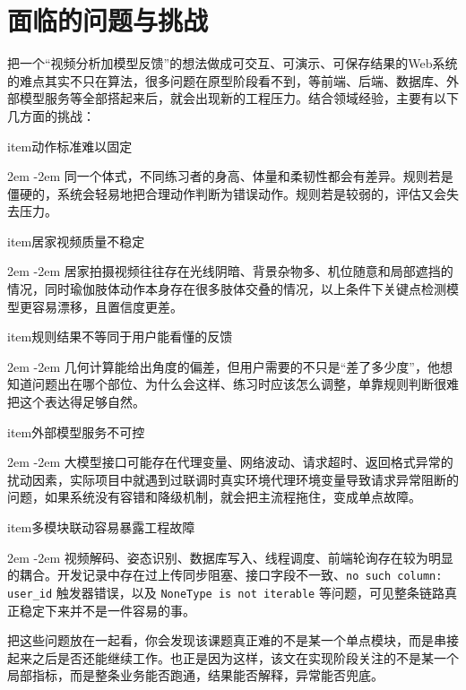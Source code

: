 \documentclass[UTF8,twoside]{ctexrep}
\makeatletter
\def@NAT@last@yr{\@citea}%
\def@NAT@last@yr{-\NAT@penalty}%
\newcommand{\listbodyaligntext}[1]{%
  \par\begingroup
    \parindent=0pt
    \parshape=2 2em \dimexpr\textwidth-2em\relax 0pt \textwidth
    \noindent\ignorespaces#1\unskip\par
  \endgroup
}
\newcommand{\researchitem}[2]{%
  \csname item\endcsname #1%
  \listbodyaligntext{#2}%
}
\makeatother
\begin{document}
\section{面临的问题与挑战}
把一个“视频分析加模型反馈”的想法做成可交互、可演示、可保存结果的Web系统的难点其实不只在算法，很多问题在原型阶段看不到，等前端、后端、数据库、外部模型服务等全部搭起来后，就会出现新的工程压力。结合领域经验，主要有以下几方面的挑战：
\begin{researchlist}
  
\researchitem{动作标准难以固定}{
    同一个体式，不同练习者的身高、体量和柔韧性都会有差异。规则若是僵硬的，系统会轻易地把合理动作判断为错误动作。规则若是较弱的，评估又会失去压力。
  }
  
\researchitem{居家视频质量不稳定}{
    居家拍摄视频往往存在光线阴暗、背景杂物多、机位随意和局部遮挡的情况，同时瑜伽肢体动作本身存在很多肢体交叠的情况，以上条件下关键点检测模型更容易漂移，且置信度更差。
  }
  
\researchitem{规则结果不等同于用户能看懂的反馈}{
    几何计算能给出角度的偏差，但用户需要的不只是“差了多少度”，他想知道问题出在哪个部位、为什么会这样、练习时应该怎么调整，单靠规则判断很难把这个表达得足够自然。
  }
  
\researchitem{外部模型服务不可控}{
    大模型接口可能存在代理变量、网络波动、请求超时、返回格式异常的扰动因素，实际项目中就遇到过联调时真实环境代理环境变量导致请求异常阻断的问题，如果系统没有容错和降级机制，就会把主流程拖住，变成单点故障。
  }
  
\researchitem{多模块联动容易暴露工程故障}{
    视频解码、姿态识别、数据库写入、线程调度、前端轮询存在较为明显的耦合。开发记录中存在过上传同步阻塞、接口字段不一致、\texttt{no such column: user\_id} 触发器错误，以及 \texttt{NoneType is not iterable} 等问题，可见整条链路真正稳定下来并不是一件容易的事。
  }
\end{researchlist}

把这些问题放在一起看，你会发现该课题真正难的不是某一个单点模块，而是串接起来之后是否还能继续工作。也正是因为这样，该文在实现阶段关注的不是某一个局部指标，而是整条业务能否跑通，结果能否解释，异常能否兜底。
\end{document}
